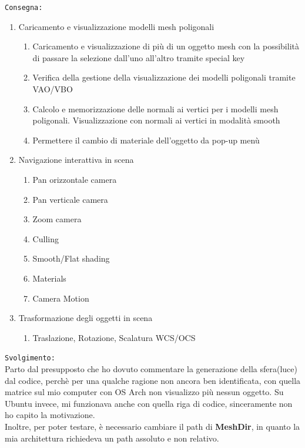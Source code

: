 \texttt{Consegna:}
\begin{enumerate}
    \item Caricamento e visualizzazione modelli mesh poligonali
    \begin{enumerate}
        \item Caricamento e visualizzazione di più di un oggetto mesh con la possibilità di passare la selezione dall'uno all'altro tramite special key
        \item Verifica della gestione della visualizzazione dei modelli poligonali tramite VAO/VBO
        \item Calcolo e memorizzazione delle normali ai vertici per i modelli mesh poligonali. Visualizzazione con normali ai vertici in modalità smooth
        \item Permettere il cambio di materiale dell'oggetto da pop-up menù
    \end{enumerate}
    \item Navigazione interattiva in scena
    \begin{enumerate}
        
        \item Pan orizzontale camera
        \item Pan verticale camera
        \item Zoom camera
        \item Culling
        \item Smooth/Flat shading
        \item Materials
        \item Camera Motion
    \end{enumerate}
    \item Trasformazione degli oggetti in scena
    \begin{enumerate}
        \item Traslazione, Rotazione, Scalatura WCS/OCS
    \end{enumerate}
    
\end{enumerate}
\texttt{Svolgimento:}\\
Parto dal presupposto che ho dovuto commentare la generazione della sfera(luce) dal codice, perchè per una qualche ragione non ancora ben identificata, con quella matrice sul mio computer con OS Arch non visualizzo più nessun oggetto. 
Su Ubuntu invece, mi funzionava anche con quella riga di codice, sinceramente non ho capito la motivazione.\\ Inoltre, per poter testare, è necessario cambiare
il path di \textbf{MeshDir}, in quanto la mia architettura richiedeva un path assoluto e non relativo.
